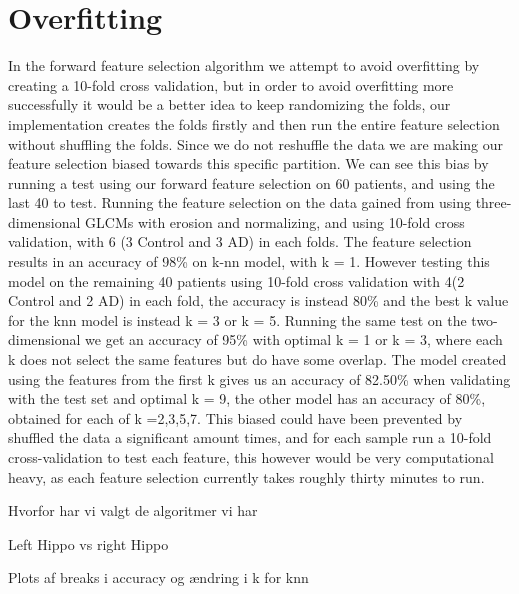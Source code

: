 \section{Overfitting}
In the forward feature selection algorithm we attempt to avoid overfitting by creating a 10-fold cross validation, but in order to avoid overfitting more successfully it would be a better idea to keep randomizing the folds, our implementation creates the folds firstly and then run the entire feature selection without shuffling the folds. Since we do not reshuffle the data we are making our feature selection biased towards this specific partition. We can see this bias by running a test using our forward feature selection on 60 patients, and using the last 40 to test.
Running the feature selection on the data gained from using three-dimensional GLCMs with erosion and normalizing, and using 10-fold cross validation, with 6 (3 Control and 3 AD) in each folds. The feature selection results in an accuracy of 98\% on k-nn model, with k = 1. However testing this model on the remaining 40 patients using 10-fold cross validation with 4(2 Control and 2 AD) in each fold, the accuracy is instead 80\% and the best k value for the knn model is instead  k = 3 or k = 5.
Running the same test on the two-dimensional we get an accuracy of 95\% with optimal k = 1 or k = 3, where each k does not select the same features but do have some overlap. The model created using the features from the first k gives us an accuracy of 82.50\% when validating with the test set and optimal k = 9, the other model has an accuracy of 80\%, obtained for each of k ={2,3,5,7}.
This biased could have been prevented by shuffled the data a significant amount times, and for each sample run a 10-fold cross-validation to test each feature, this however would be very computational heavy, as each feature selection currently takes roughly thirty minutes to run.






Hvorfor har vi valgt de algoritmer vi har


Left Hippo vs right Hippo


Plots af breaks i accuracy og ændring i k for knn 
